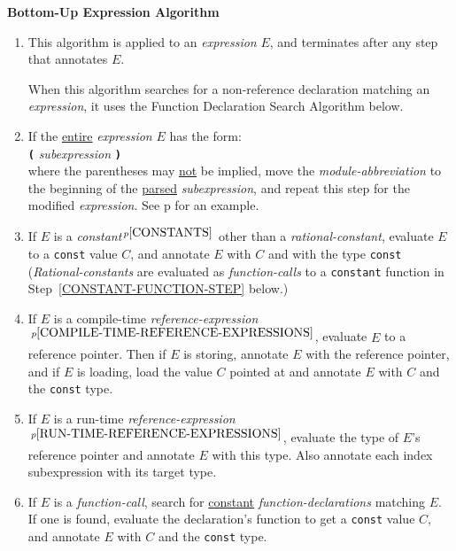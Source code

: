 \documentclass[12pt]{article}
\newcommand{\TT}[1]{{\tt \bfseries #1}}
\newcommand{\pagref}[1]{p\pageref{#1}}
\newcommand{\pagnote}[1]{$\,^{p\pageref{#1}}$}
\begin{document}
\centerline{\bf Bottom-Up Expression Algorithm}
\begin{enumerate}

\item This algorithm is applied to an {\em expression} $E$, and
terminates after any step that annotates $E$.

When this algorithm searches for a non-reference
declaration matching an {\em expression},
it uses the Function Declaration Search Algorithm below.

\item\label{MODULE-PROPAGATION-STEP}
If the \underline{entire} {\em expression} $E$ has the form: \\
\hspace*{2in}{\em module-abbreviation} \TT{(} {\em subexpression} \TT{)} \\
where the parentheses may \underline{not}
be implied, move the {\em module-abbreviation}
to the beginning of the \underline{parsed} {\em subexpression}, and
repeat this step for the modified {\em expression}.
See \pagref{MA-SYNTACTIC-SUGAR} for an example.

\item\label{CONSTANT-STEP}
If $E$ is a {\em constant}\pagnote{CONSTANTS} other than
a {\em rational-constant}, evaluate $E$
to a {\tt const} value $C$, and annotate $E$
with $C$ and with the type {\tt const}
({\em Rational-constants} are evaluated as {\em function-calls} to
a {\tt constant} function in Step~\ref{CONSTANT-FUNCTION-STEP} below.)

\item\label{COMPILE-TIME-REFERENCE-EXPRESSION-STEP}
If $E$ is a compile-time
{\em reference-expression}\pagnote{COMPILE-TIME-REFERENCE-EXPRESSIONS},
evaluate $E$ to a reference pointer.  Then if $E$ is storing, annotate
$E$ with the reference pointer, and if $E$ is loading, load the value $C$
pointed at and annotate $E$ with $C$ and the {\tt const} type.

\item\label{RUN-TIME-REFERENCE-EXPRESSION-STEP}
If $E$ is a run-time
{\em reference-expression}\pagnote{RUN-TIME-REFERENCE-EXPRESSIONS},
evaluate the type of $E$'s reference pointer and annotate
$E$ with this type.  Also annotate each index subexpression with its
target type.

\item\label{CONSTANT-FUNCTION-STEP}
If $E$ is a {\em function-call},
search for \underline{constant} {\em function-declarations}
matching $E$.  If one is found,
evaluate the declaration's function to get a {\tt const} value $C$,
and annotate $E$ with $C$ and the {\tt const} type.


\end{enumerate}
\end{document}
